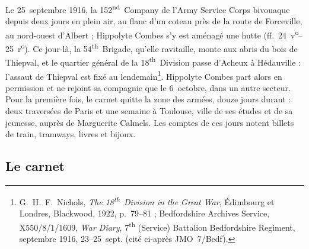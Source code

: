 Le 25~septembre 1916, la 152\textsuperscript{nd}~Company de l'Army Service Corps bivouaque depuis deux jours en plein air, au flanc d'un coteau près de la route de Forceville, au nord-ouest d'Albert ; Hippolyte Combes s'y est aménagé une hutte (ff.~24~v\textsuperscript{o}--25~r\textsuperscript{o}). Ce jour-là, la 54\textsuperscript{th}~Brigade, qu'elle ravitaille, monte aux abris du bois de Thiepval, et le quartier général de la 18\textsuperscript{th}~Division passe d'Acheux à Hédauville : l'assaut de Thiepval est fixé au lendemain\footnote{G.~H.~F.~Nichols, \textit{The 18\textsuperscript{th}~Division in the Great War}, Édimbourg et Londres, Blackwood, 1922, p.~79--81 ; Bedfordshire Archives Service, X550/8/1/1609, \textit{War Diary}, 7\textsuperscript{th} (Service) Battalion Bedfordshire Regiment, septembre 1916, 23--25~sept. (cité ci-après JMO~7/Bedf).}. Hippolyte Combes part alors en permission et ne rejoint sa compagnie que le 6~octobre, dans un autre secteur. Pour la première fois, le carnet quitte la zone des armées, douze jours durant : deux traversées de Paris et une semaine à Toulouse, ville de ses études et de sa jeunesse, auprès de Marguerite Calmels. Les comptes de ces jours notent billets de train, tramways, livres et bijoux.

\subsection*{Le carnet}

